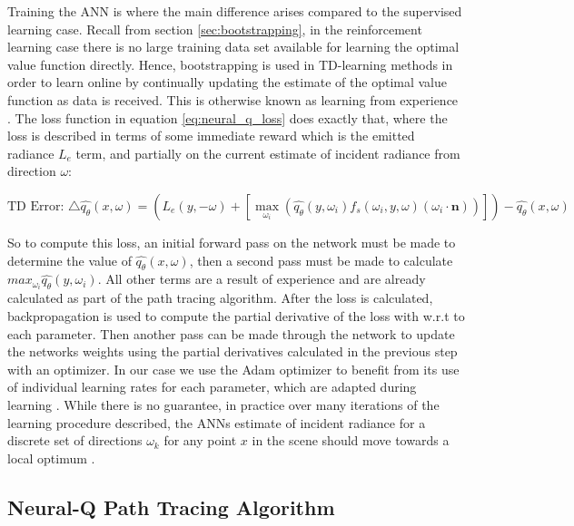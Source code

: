 \documentclass[../dissertation.tex]{subfiles}
\begin{document}
Training the ANN is where the main difference arises compared to the supervised learning case. Recall from section \ref{sec:bootstrapping}, in the reinforcement learning case there is no large training data set available for learning the optimal value function directly. Hence, bootstrapping is used in TD-learning methods in order to learn online by continually updating the estimate of the optimal value function as data is received. This is otherwise known as learning from experience \cite{sutton2011reinforcement}. The loss function in equation \ref{eq:neural_q_loss} does exactly that, where the loss is described in terms of some immediate reward which is the emitted radiance $L_e$ term, and partially on the current estimate of incident radiance from direction $\omega$:

$$\text{TD Error: } \triangle \hat{q_\theta}(x, \omega) = \left( L_e(y, -\omega) + \left[ \max_{\omega_i} \left(\hat{q_\theta}(y, \omega_i) f_s(\omega_i, y, \omega) (\omega_i \cdot \mathbf{n}) \right) \right] \right) - \hat{q_\theta}(x, \omega)$$

So to compute this loss, an initial forward pass on the network must be made to determine the value of $\hat{q_\theta}(x, \omega)$, then a second pass must be made to calculate $max_{\omega_i} \hat{q_\theta}(y, \omega_i)$. All other terms are a result of experience and are already calculated as part of the path tracing algorithm. After the loss is calculated, backpropagation is used to compute the partial derivative of the loss with w.r.t to each parameter. Then another pass can be made through the network to update the networks weights using the partial derivatives calculated in the previous step with an optimizer. In our case we use the Adam optimizer to benefit from its use of individual learning rates for each parameter, which are adapted during learning \cite{kingma2014adam}. While there is no guarantee, in practice over many iterations of the learning procedure described, the ANNs estimate of incident radiance for a discrete set of directions $\omega_k$ for any point $x$ in the scene should move towards a local optimum \cite{deep_rl_function_approx}.

\subsection{Neural-Q Path Tracing Algorithm}
\end{document}
